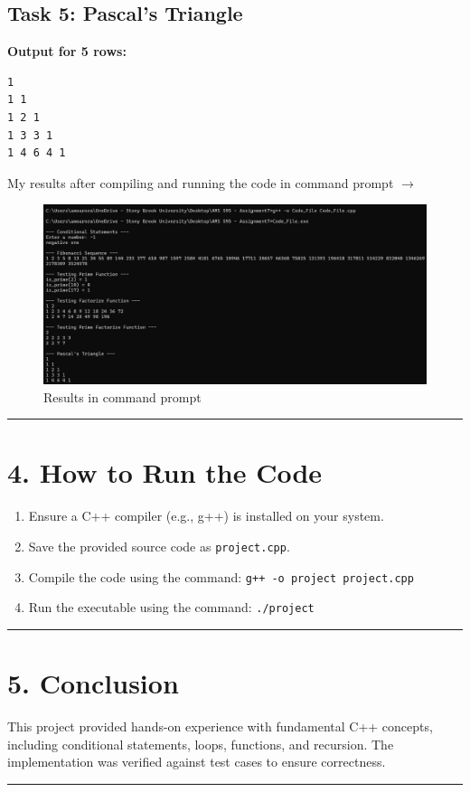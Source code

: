 \documentclass[12pt]{article}
\begin{document}
\subsection*{Task 5: Pascal's Triangle}
\textbf{Output for 5 rows:}
\begin{verbatim}
1
1 1
1 2 1
1 3 3 1
1 4 6 4 1
\end{verbatim}
My results after compiling and running the code in command prompt $\longrightarrow$
\begin{figure}[H]
    \centering
    \includegraphics[width=1.13\textwidth]{results.png}
    \caption{Results in command prompt}
    \label{fig:results}
\end{figure}
\hrule
\section*{4. How to Run the Code}
\begin{enumerate}
    \item Ensure a C++ compiler (e.g., g++) is installed on your system.
    \item Save the provided source code as \texttt{project.cpp}.
    \item Compile the code using the command: \newline
    \texttt{g++ -o project project.cpp}
    \item Run the executable using the command: \newline
    \texttt{./project}
\end{enumerate}
\hrule
\section*{5. Conclusion}
This project provided hands-on experience with fundamental C++ concepts, including conditional statements, loops, functions, and recursion. The implementation was verified against test cases to ensure correctness.
\vspace{6pt}
\hrule
\end{document}
